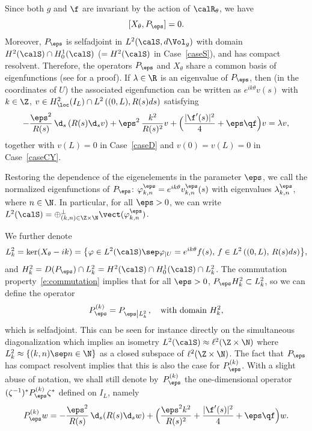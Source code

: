 Since both $g$ and $\f$ are invariant by the action of $\calR_\theta$, we have
\begin{equation}
\label{e:commutation}
[X_{\theta}, P_\eps ] =0.
\end{equation}
Moreover, $P_\eps$ is selfadjoint in $L^2(\calS, d\Vol_g)$ with domain $H^2(\calS) \cap H^1_0(\calS)$ ($=H^2(\calS)$ in Case~\ref{caseS}), and has compact resolvent. Therefore, the operators $P_\eps$ and $X_\theta$ share a common basis of eigenfunctions (see \eg \cite[\S 3.2]{LL:18} for a proof).
If $\lambda \in\R$ is an eigenvalue of $P_\eps$, then (in the coordinates of $U$) the associated eigenfunction can be written as $e^{ik \theta}v(s)$ with $k\in \Z$, $v \in H^2_{\loc}(I_L)\cap L^2\left((0,L), R(s)ds\right)$ satisfying
\begin{equation}
\label{equationk1D}
- \frac{\eps^2 }{R(s)}\, \d_s\left( R(s) \d_s v \right) + \eps^2\,\frac{k^2}{R(s)^2} v+ \Bigl( \frac{|\f'(s)|^2}{4} + \eps \qf\Bigr) v =\lambda v,
\end{equation}
together with $v(L)=0$ in Case~\ref{caseD} and $v(0)=v(L)=0$ in Case~\ref{caseCY}.

Restoring the dependence of the eigenelements in the parameter $\eps$, we call the normalized eigenfunctions of $P_\eps$: $\varphi_{k,n}^\eps=e^{ik \theta} v_{k,n}^\eps(s)$ with eigenvalues $\lambda_{k,n}^\eps$, where \hbox{$n\in \N$}. In particular, for all $\eps>0$, we can write $L^2(\calS)= \oplus^{\perp }_{(k,n)\in \Z\times \N}\vect (\varphi_{k,n}^\eps) $.

We further denote
\[
L^2_k=\ker (X_{\theta}-ik)=\bigl\{\varphi\in L^2(\calS)\sep\varphi_{|U} =e^{ik \theta}f(s),\,f \in L^2\left((0,L),\,R(s)ds\right)\bigr\},
\]
and $H^2_k=D(P_\eps) \cap L^2_k = H^2(\calS)\cap H^1_0(\calS)\cap L^2_k$. The commutation property~\eqref{e:commutation} implies that for all $\eps>0$, $P_\eps H^2_k\subset L^2_k$, so we can define the operator
\begin{equation}
\label{defPk}P_{\eps}^{(k)} =P_{\eps\left|L^2_k\right.}, \quad \text{with domain } H^2_k,
\end{equation}
which is selfadjoint. This can be seen for instance directly on the simultaneous diagonalization which implies an isometry $L^2(\calS) \approx \ell^2(\Z\times \N)$ where $L^2_k\approx\{(k,n)\sep n\in \N\}$ as a closed subspace of $\ell^2(\Z\times \N)$. The fact that $P_{\eps}$ has compact resolvent implies that this is also the case for $P_{\eps}^{(k)}$.
With a slight abuse of notation, we shall still denote by~$P_{\eps}^{(k)}$ the one-dimensional operator $(\zeta^{-1})^*P_{\eps}^{(k)} \zeta^*$ defined on $I_L$, namely
\begin{equation}
\label{equationk1D-bis}
P_{\eps}^{(k)} w = - \frac{\eps^2 }{R(s)}\, \d_s( R(s) \d_s w) + \Bigl(\frac{ \eps^2 k^2}{R(s)^2} + \frac{|\f'(s)|^2}{4} + \eps \qf\Bigr) w.
\end{equation}
